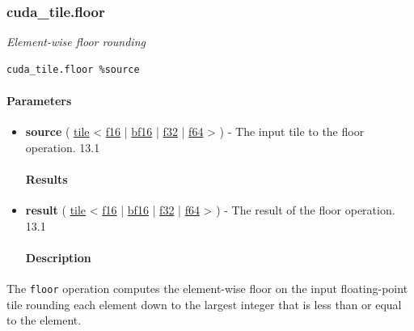 \documentclass{article}
\begin{document}
\subsubsection{cuda\_tile.floor}

\textit{Element-wise floor rounding}


\begin{lstlisting}
cuda_tile.floor %source
\end{lstlisting}

\paragraph{Parameters}

\begin{itemize}
\item \textbf{source} ( \href{https://docs.nvidia.com/cuda/tile-ir/latest/sections/types.html#type-tile}{tile} < \href{https://docs.nvidia.com/cuda/tile-ir/latest/sections/types.html#subsection-element-types}{f16} | \href{https://docs.nvidia.com/cuda/tile-ir/latest/sections/types.html#subsection-element-types}{bf16} | \href{https://docs.nvidia.com/cuda/tile-ir/latest/sections/types.html#subsection-element-types}{f32} | \href{https://docs.nvidia.com/cuda/tile-ir/latest/sections/types.html#subsection-element-types}{f64} > ) - The input tile to the floor operation. 13.1


\paragraph{Results}

\item \textbf{result} ( \href{https://docs.nvidia.com/cuda/tile-ir/latest/sections/types.html#type-tile}{tile} < \href{https://docs.nvidia.com/cuda/tile-ir/latest/sections/types.html#subsection-element-types}{f16} | \href{https://docs.nvidia.com/cuda/tile-ir/latest/sections/types.html#subsection-element-types}{bf16} | \href{https://docs.nvidia.com/cuda/tile-ir/latest/sections/types.html#subsection-element-types}{f32} | \href{https://docs.nvidia.com/cuda/tile-ir/latest/sections/types.html#subsection-element-types}{f64} > ) - The result of the floor operation. 13.1


\paragraph{Description}

\end{itemize}
The \texttt{floor} operation computes the element-wise floor on the input floating-point tile rounding each element down to the largest integer that is less than or equal to the element.
\end{document}
